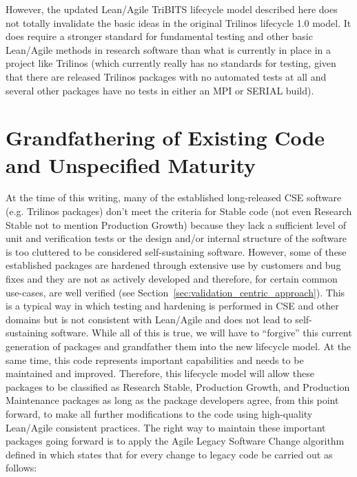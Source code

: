 \documentclass[11pt]{SANDreport}
\begin{document}
However, the updated Lean/Agile TriBITS lifecycle model described here
does not totally invalidate the basic ideas in the original Trilinos
lifecycle 1.0 model. It does require a stronger standard for
fundamental testing and other basic Lean/Agile methods in research
software than what is currently in place in a project like Trilinos
(which currently really has no standards for testing, given that there
are released Trilinos packages with no automated tests at all and
several other packages have no tests in either an MPI or SERIAL
build).


%
{}\section{Grandfathering of Existing Code and Unspecified Maturity}
\label{sec:grandfathering}
%

At the time of this writing, many of the established long-released CSE
software (e.g. Trilinos packages) don't meet the criteria for Stable
code (not even Research Stable not to mention Production Growth)
because they lack a sufficient level of unit and verification tests or
the design and/or internal structure of the software is too cluttered
to be considered self-sustaining software.  However, some of these
established packages are hardened through extensive use by customers
and bug fixes and they are not as actively developed and therefore,
for certain common use-cases, are well verified (see
Section~\ref{sec:validation_centric_approach}).  This is a typical
way in which testing and hardening is performed in CSE and other
domains but is not consistent with Lean/Agile and does not lead to
self-sustaining software.  While all of this is true, we will have to
``forgive'' this current generation of packages and grandfather them
into the new lifecycle model.  At the same time, this code represents
important capabilities and needs to be maintained and improved.
Therefore, this lifecycle model will allow these packages to be
classified as Research Stable, Production Growth, and Production
Maintenance packages as long as the package developers agree, from
this point forward, to make all further modifications to the code
using high-quality Lean/Agile consistent practices.  The right way to
maintain these important packages going forward is to apply the Agile
Legacy Software Change algorithm defined in
{}\cite{WorkingEffectivelyWithLegacyCode05} which states that for
every change to legacy code be carried out as follows:
\end{document}
